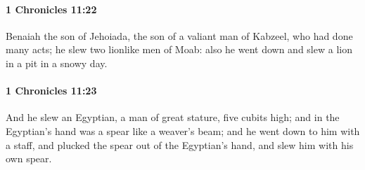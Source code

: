 		\paragraph{1 Chronicles 11:22} %
			\label{1CHRONICLES-11-22}

			Benaiah the son of Jehoiada, the son of a valiant man of Kabzeel, who had done many acts; he slew two lionlike men of Moab: also he went down and slew a lion in a pit in a snowy day.


		\paragraph{1 Chronicles 11:23} %
			\label{1CHRONICLES-11-23}

			And he slew an Egyptian, a man of great stature, five cubits high; and in the Egyptian’s hand was a spear like a weaver’s beam; and he went down to him with a staff, and plucked the spear out of the Egyptian’s hand, and slew him with his own spear.

